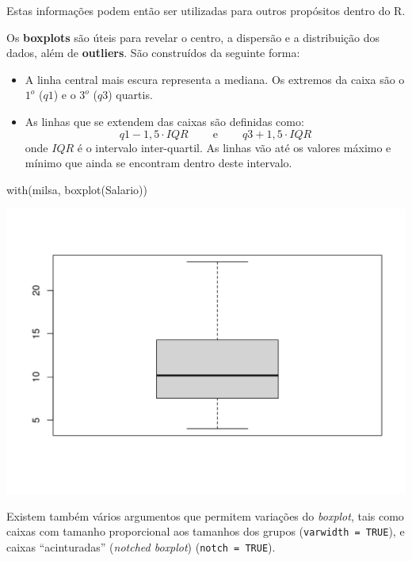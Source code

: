 \documentclass[
  10pt,
  a4paper]{book}
\newenvironment{Shaded}{\begin{snugshade}}{\end{snugshade}}
\newcommand{\FunctionTok}[1]{\textcolor[rgb]{0.00,0.00,0.00}{#1}}
\newcommand{\NormalTok}[1]{#1}
\providecommand{\tightlist}{%
  \setlength{\itemsep}{0pt}\setlength{\parskip}{0pt}}
\begin{document}
Estas informações podem então ser utilizadas para outros propósitos
dentro do R.

Os \textbf{boxplots} são úteis para revelar o centro, a dispersão e a
distribuição dos dados, além de \textbf{outliers}. São construídos da
seguinte forma:

\begin{itemize}
\tightlist
\item
  A linha central mais escura representa a mediana. Os extremos da
  caixa são o \(1^{o}\) (\(q1\)) e o \(3^{o}\) (\(q3\)) quartis.
\item
  As linhas que se extendem das caixas são definidas como:
  \[q1-1,5\cdot IQR\ \qquad \mathrm{e}\ \qquad q3+1,5\cdot IQR\]
  onde \(IQR\) é o intervalo inter-quartil. As linhas vão até os valores
  máximo e mínimo que ainda se encontram dentro deste intervalo.
\end{itemize}

\begin{Shaded}
\begin{Highlighting}[]
\FunctionTok{with}\NormalTok{(milsa, }\FunctionTok{boxplot}\NormalTok{(Salario))}
\end{Highlighting}
\end{Shaded}

\begin{center}\includegraphics{figures/unnamed-chunk-314-1} \end{center}

Existem também vários argumentos que permitem variações do \emph{boxplot},
tais como caixas com tamanho proporcional aos tamanhos
dos grupos (\texttt{varwidth\ =\ TRUE}), e caixas ``acinturadas'' (\emph{notched
boxplot}) (\texttt{notch\ =\ TRUE}).
\end{document}
